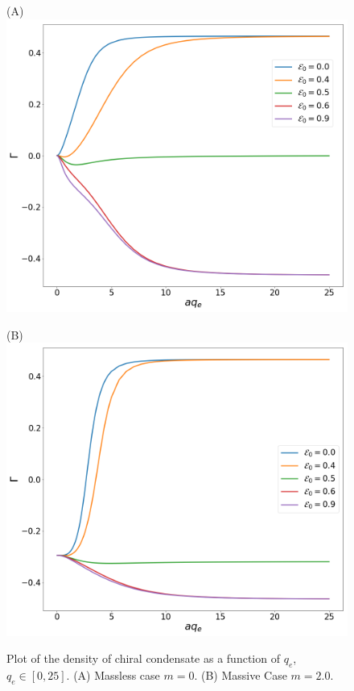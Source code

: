 \begin{figure}[h]
	\begin{minipage}{.5\textwidth}
		\centering(A)
		\includegraphics[scale=0.18]{figures/ChiralCond_m=00.png}
	\end{minipage}%
	\begin{minipage}{0.5\textwidth}
		\centering(B)
		\includegraphics[scale=0.18]{figures/ChiralCond_m=20.png}
	\end{minipage}
	\caption{Plot of the density of chiral condensate as a function of $q_e$, $q_e\in[0,25]$. (A) Massless case $m=0$. (B) Massive Case $m=2.0$.}\label{fig:chiralcondq}
\end{figure}

